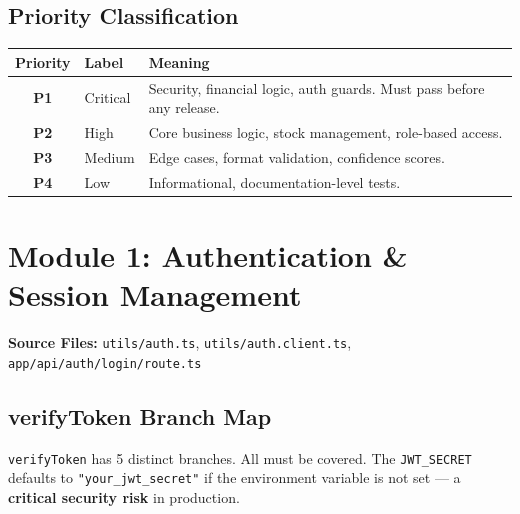 ﻿\documentclass[12pt,a4paper]{report}
\newcommand{\pone}{\textbf{\color{p1red}P1}}
\newcommand{\ptwo}{\textbf{\color{p2orange}P2}}
\newcommand{\pthree}{\textbf{\color{p3blue}P3}}
\newcommand{\pfour}{\textbf{\color{p4green}P4}}
\begin{document}
\subsection{Priority Classification}

\begin{center}
\begin{tabular}{clp{9cm}}
  \toprule
  \textbf{Priority} & \textbf{Label} & \textbf{Meaning} \\
  \midrule
  \pone & Critical & Security, financial logic, auth guards. Must pass before any release. \\
  \ptwo & High     & Core business logic, stock management, role-based access. \\
  \pthree & Medium & Edge cases, format validation, confidence scores. \\
  \pfour & Low     & Informational, documentation-level tests. \\
  \bottomrule
\end{tabular}
\end{center}

\section{Module 1: Authentication \& Session Management}

\textbf{Source Files:} \texttt{utils/auth.ts}, \texttt{utils/auth.client.ts}, \texttt{app/api/auth/login/route.ts}

\subsection{verifyToken Branch Map}

\begin{tcolorbox}[warningbox,title={Security-Critical Function --- 5 Branches}]
\texttt{verifyToken} has 5 distinct branches. All must be covered. The \texttt{JWT\_SECRET} defaults to \texttt{"your\_jwt\_secret"} if the environment variable is not set --- a \textbf{critical security risk} in production.
\end{tcolorbox}
\end{document}
